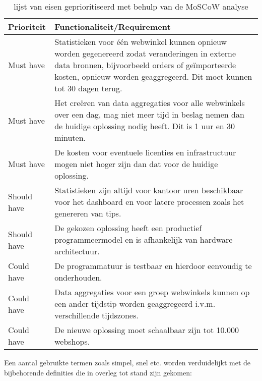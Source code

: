 \begin{table}[bh]
\centering
\caption{lijst van eisen geprioritiseerd met behulp van de MoSCoW analyse}
\label{table:requirements}
\def\arraystretch{1.5}

\begin{tabular}{|l|p{12.5cm}|}
\hline
\textbf{Prioriteit} & \textbf{Functionaliteit/Requirement}
\\ \hline
Must have           & Statistieken voor één webwinkel kunnen opnieuw worden gegenereerd zodat veranderingen in externe data bronnen, bijvoorbeeld orders of geïmporteerde kosten, opnieuw worden geaggregeerd. Dit moet kunnen tot 30 dagen terug.
\\ \hline
Must have           & Het creëren van data aggregaties voor alle webwinkels over een dag, mag niet meer tijd in beslag nemen dan de huidige oplossing nodig heeft. Dit is 1 uur en 30 minuten.
\\ \hline
Must have           & De kosten voor eventuele licenties en infrastructuur mogen niet hoger zijn dan dat voor de huidige oplossing.
\\ \hline
Should have         & Statistieken zijn altijd voor kantoor uren beschikbaar voor het dashboard en voor latere processen zoals het genereren van tips.
\\ \hline
Should have         & De gekozen oplossing heeft een productief programmeermodel en is afhankelijk van hardware architectuur.
\\ \hline
Could have         & De programmatuur is testbaar en hierdoor eenvoudig te onderhouden.
\\ \hline
Could have          & Data aggregaties voor een groep webwinkels kunnen op een ander tijdstip worden geaggregeerd i.v.m. verschillende tijdszones.
\\ \hline
Could have         & De nieuwe oplossing moet schaalbaar zijn tot 10.000 webshops.
\\ \hline
\end{tabular}
\end{table}

Een aantal gebruikte termen zoals simpel, snel etc. worden verduidelijkt met de bijbehorende definities die in overleg tot stand zijn gekomen:

